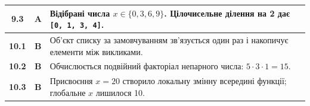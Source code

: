 \begin{longtable}{|c|c|p{11.5cm}|}
	\textbf{9.3} & \textbf{A} & Відібрані числа $x \in \{0, 3, 6, 9\}$. Цілочисельне ділення на 2 дає \texttt{[0, 1, 3, 4]}. \\ \hline
	\textbf{10.1} & \textbf{B} & Об'єкт списку за замовчуванням зв'язується один раз і накопичує елементи між викликами. \\ \hline
	\textbf{10.2} & \textbf{B} & Обчислюється подвійний факторіал непарного числа: $5 \cdot 3 \cdot 1 = 15$. \\ \hline
	\textbf{10.3} & \textbf{B} & Присвоєння $x = 20$ створило локальну змінну всередині функції; глобальне $x$ лишилося 10. \\ \hline
\end{longtable}
